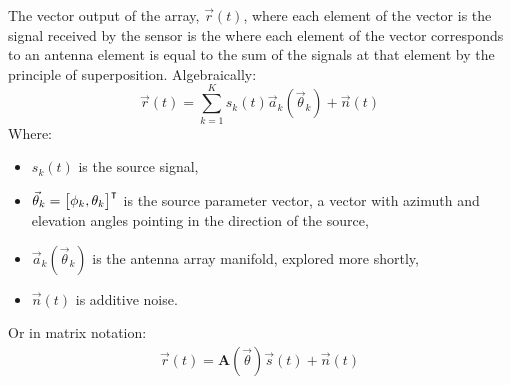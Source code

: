 The vector output of the array, \(\vec{r}(t)\), where each element of the vector is the signal received by the sensor is the where each element of the vector corresponds to an antenna element is equal to the sum of the signals at that element by the principle of superposition. Algebraically:
\begin{equation}
  \vec{r}(t) = \sum_{k=1}^{K} s_k(t)\vec{a}_k(\vec{\theta}_k) + \vec{n}(t)
\end{equation}
Where:
\begin{itemize}
  \item \(s_k(t)\) is the source signal,
  \item \(\vec{\theta}_k = \begin{bmatrix} \phi_k, \theta_k \end{bmatrix}^\intercal\) is the source parameter vector, a vector with azimuth and elevation angles pointing in the direction of the source,
  \item \(\vec{a}_k(\vec{\theta}_k)\) is the antenna array manifold, explored more shortly,
  \item \(\vec{n}(t)\) is additive noise.
\end{itemize}

Or in matrix notation:
\begin{align}
  \vec{r}(t) = \mathbf{A}(\vec{\theta})\vec{s}(t) + \vec{n}(t)
\end{align}

